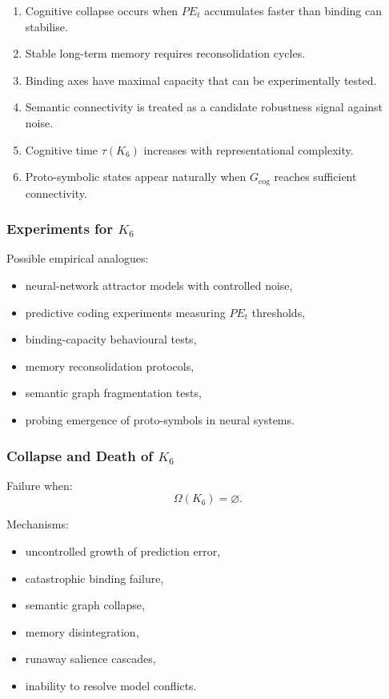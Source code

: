 \begin{enumerate}
    \item Cognitive collapse occurs when $PE_t$ accumulates faster than binding can stabilise.
    \item Stable long-term memory requires reconsolidation cycles.
    \item Binding axes have maximal capacity that can be experimentally tested.
    \item Semantic connectivity is treated as a candidate robustness signal against noise.
    \item Cognitive time $\tau(K_6)$ increases with representational complexity.
    \item Proto-symbolic states appear naturally when $G_{\mathrm{cog}}$ reaches sufficient connectivity.
\end{enumerate}

\subsubsection{Experiments for \texorpdfstring{$K_6$}{K_6}}

Possible empirical analogues:
\begin{itemize}
    \item neural-network attractor models with controlled noise,
    \item predictive coding experiments measuring $PE_t$ thresholds,
    \item binding-capacity behavioural tests,
    \item memory reconsolidation protocols,
    \item semantic graph fragmentation tests,
    \item probing emergence of proto-symbols in neural systems.
\end{itemize}

\subsubsection{Collapse and Death of \texorpdfstring{$K_6$}{K_6}}

Failure when:
\[
\Omega(K_6) = \varnothing.
\]

Mechanisms:
\begin{itemize}
    \item uncontrolled growth of prediction error,
    \item catastrophic binding failure,
    \item semantic graph collapse,
    \item memory disintegration,
    \item runaway salience cascades,
    \item inability to resolve model conflicts.
\end{itemize}

